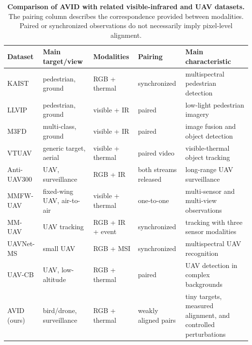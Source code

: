 \documentclass[10pt]{article}
\newcommand{\dataset}{\textsc{AVID}}
\begin{document}
\begin{table}[t]
\centering
\caption{\textbf{Comparison of \dataset{} with related visible-infrared and UAV datasets.}
The pairing column describes the correspondence provided between modalities. Paired or synchronized observations do not necessarily imply pixel-level alignment.}
\label{tab:related}
\small
\begin{threeparttable}
\begin{tabularx}{\linewidth}{@{}l l l l X@{}}
\toprule
Dataset & Main target/view & Modalities & Pairing & Main characteristic \\
\midrule

KAIST \citep{hwang2015kaist}
& pedestrian, ground
& RGB + thermal
& synchronized
& multispectral pedestrian detection \\

LLVIP \citep{jia2021llvip}
& pedestrian, ground
& visible + IR
& paired
& low-light pedestrian imagery \\

M3FD \citep{liu2022tardal}
& multi-class, ground
& visible + IR
& paired
& image fusion and object detection \\

VTUAV \citep{zhang2022vtuav}
& generic target, aerial
& visible + thermal
& paired video
& visible-thermal object tracking \\

Anti-UAV300 \citep{antiuavrepo}
& UAV, surveillance
& RGB + IR
& both streams released
& long-range UAV surveillance \\

MMFW-UAV \citep{liu2025mmfwuav}
& fixed-wing UAV, air-to-air
& visible + thermal
& one-to-one
& multi-sensor and multi-view observations \\

MM-UAV \citep{xu2025mmuav}
& UAV tracking
& RGB + IR + event
& synchronized
& tracking with three sensor modalities \\

UAVNet-MS \citep{luo2026uavnetms}
& small UAV
& RGB + MSI
& synchronized
& multispectral UAV recognition \\

UAV-CB \citep{huang2026uavcb}
& UAV, low-altitude
& RGB + thermal
& paired
& UAV detection in complex backgrounds \\

\rowcolor{blue!4}
\dataset{} (ours)
& bird/drone, surveillance
& RGB + thermal
& weakly aligned pairs
& tiny targets, measured alignment, and controlled perturbations \\

\bottomrule
\end{tabularx}
\end{threeparttable}
\end{table}
\end{document}

